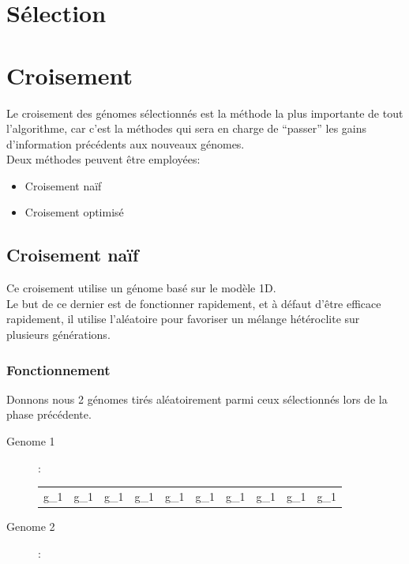         \section{Sélection}
        \section{Croisement}
            Le croisement des génomes sélectionnés est la méthode la plus importante de tout l'algorithme, car c'est la méthodes qui sera en charge de ``passer'' les gains d'information précédents aux nouveaux génomes.\\
            Deux méthodes peuvent être employées:
            \begin{itemize}
                \item Croisement naïf
                \item Croisement optimisé
            \end{itemize}
            \subsection{Croisement naïf}
                Ce croisement utilise un génome basé sur le modèle 1D.\\
                Le but de ce dernier est de fonctionner rapidement, et à défaut d'être efficace rapidement, il utilise l'aléatoire pour favoriser un mélange hétéroclite sur plusieurs générations.\\
                \subsubsection{Fonctionnement}
                    Donnons nous 2 génomes tirés aléatoirement parmi ceux sélectionnés lors de la phase précédente.\\
                    \begin{description}
                        \item[Genome 1]:\\
                            \begin{tabular}{|c|c|c|c|c|c|c|c|c|c|}
                                \hline
                                g_1&g_1&g_1&g_1&g_1&g_1&g_1&g_1&g_1&g_1
                                \hline
                            \end{tabular}
                        \item[Genome 2]:\\
                    \end{description}
